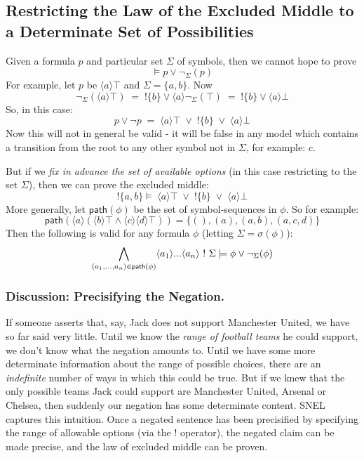 \subsection{Restricting the Law of the Excluded Middle to a Determinate Set of Possibilities}
Given a formula $p$ and particular set $\Sigma$ of symbols, then we cannot hope to prove 
\[
\models p \lor \neg_\Sigma(p)
\]
For example, let $p$ be $\langle a \rangle \top$ and $\Sigma = \{a, b\}$.
Now
\[
\neg_\Sigma(\langle a \rangle \top) \; = \; ! \{b\} \lor \langle a \rangle \neg_\Sigma(\top) \; =  \; ! \{b\} \lor \langle a \rangle \bot
\]
So, in this case:
\[
p \lor \neg p \; = \; \langle a \rangle \top \; \lor \; ! \{b\} \; \lor \; \langle a \rangle \bot
\]
Now this will not in general be valid - it will be false in any model which contains a transition from the root to any other symbol not in $\Sigma$, for example: $c$.

But if we \emph{fix in advance the set of available options} (in this case restricting to the set $\Sigma$), then we can prove the excluded middle:
\[
!\{a, b\} \models \; \langle a \rangle \top \; \lor \; ! \{b\} \; \lor \; \langle a \rangle \bot
\]
More generally, let $\mathsf{path}(\phi)$ be the set of symbol-sequences in $\phi$.
So for example:
\[
\mathsf{path}(\langle a \rangle (\langle b \rangle \top \land \langle c \rangle \langle d \rangle \top)) = \{(), (a), (a, b), (a, c, d)\}
\]
Then the following is valid for any formula $\phi$ (letting $\Sigma = \sigma(\phi)$): 
\[
\bigwedge_{(a_1, ..., a_n) \in \mathsf{path}(\phi)} \langle a_1 \rangle ... \langle a_n \rangle \ ! \  \Sigma \models \phi \lor \neg_\Sigma (\phi)
\]
\subsubsection{Discussion: Precisifying the Negation. }
If someone asserts that, say, Jack does not support Manchester United, we have so far said very little. 
Until we know the \emph{range of football teams} he could support, we don't know what the negation amounts to. 
Until we have some more determinate information about the range of possible choices, there are an \emph{indefinite} number of ways in which this could be true.
But if we knew that the only possible teams Jack could support are Manchester United, Arsenal or Chelsea, then suddenly our negation has some determinate content.
SNEL captures this intuition. 
Once a negated sentence has been precisified by specifying the range of allowable options (via the $!$ operator), the negated claim can be made precise, and the law of excluded middle can be proven.

